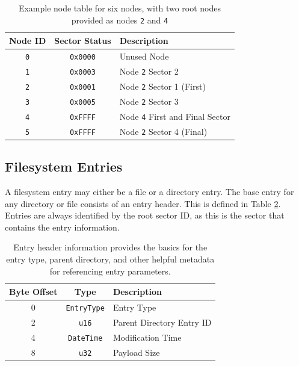 \documentclass{article}
\begin{document}
\begin{table}[h!]
    \centering
    \begin{tabular}{c|c|l}
        \hline
        Node ID & Sector Status & Description \\
        \hline
        \texttt{0} & \texttt{0x0000} & Unused Node \\
        \texttt{1} & \texttt{0x0003} & Node \texttt{2} Sector 2 \\
        \texttt{2} & \texttt{0x0001} & Node \texttt{2} Sector 1 (First) \\
        \texttt{3} & \texttt{0x0005} & Node \texttt{2} Sector 3 \\
        \texttt{4} & \texttt{0xFFFF} & Node \texttt{4} First and Final Sector \\
        \texttt{5} & \texttt{0xFFFF} & Node \texttt{2} Sector 4 (Final) \\
        \hline
    \end{tabular}
    \caption{Example node table for six nodes, with two root nodes provided as nodes \texttt{2} and \texttt{4}}
    \label{table:node-table-example}
\end{table}

\subsection{Filesystem Entries}

A filesystem entry may either be a file or a directory entry. The base entry for any directory or file consists of an entry header. This is defined in Table \ref{table:cbfs-entry-header}. Entries are always identified by the root sector ID, as this is the sector that contains the entry information.

\begin{table}[h!]
    \centering
    \begin{tabular}{cc|l}
        \hline
        Byte Offset & Type & Description \\
        \hline
        0 & \texttt{EntryType} & Entry Type \\
        2 & \texttt{u16} & Parent Directory Entry ID \\
        4 & \texttt{DateTime} & Modification Time \\
        8 & \texttt{u32} & Payload Size \\
        \hline
    \end{tabular}
    \caption{Entry header information provides the basics for the entry type, parent directory, and other helpful metadata for referencing entry parameters.}
    \label{table:cbfs-entry-header}
\end{table}
\end{document}
